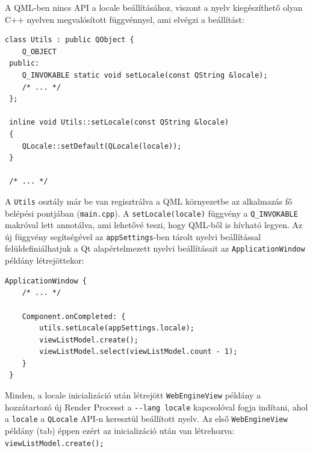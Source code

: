 \documentclass[12pt]{report}
\begin{document}
A QML-ben nincs API a locale beállításához, viszont a nyelv kiegészíthető olyan C++ nyelven
megvalósított függvénnyel, ami elvégzi a beállítást:
\begin{lstlisting}[title=utils.h]
 class Utils : public QObject {
    Q_OBJECT
 public:
    Q_INVOKABLE static void setLocale(const QString &locale);
    /* ... */
 };

 inline void Utils::setLocale(const QString &locale)
 {
    QLocale::setDefault(QLocale(locale));
 }

 /* ... */
\end{lstlisting}
A \texttt{Utils} osztály már be van regisztrálva a QML környezetbe az alkalmazás fő belépési
pontjában (\texttt{main.cpp}). A \texttt{setLocale(locale)} függvény a \texttt{Q\_INVOKABLE}
makróval lett annotálva, ami lehetővé teszi, hogy QML-ből is hívható legyen. Az új függvény
segítségével az \texttt{appSettings}-ben tárolt nyelvi beállítással felüldefiniálhatjuk a
Qt alapértelmezett nyelvi beállításait az \texttt{ApplicationWindow} példány létrejöttekor:
\begin{lstlisting}[title=main.qml]
 ApplicationWindow {
    /* ... */

    Component.onCompleted: {
        utils.setLocale(appSettings.locale);
        viewListModel.create();
        viewListModel.select(viewListModel.count - 1);
    }
 }
\end{lstlisting}
Minden, a locale inicializáció után létrejött \texttt{WebEngineView} példány a hozzátartozó
új Render Processt a \texttt{-{}-lang locale} kapcsolóval fogja indítani, ahol a
\texttt{locale} a \texttt{QLocale} API-n keresztül beállított nyelv. Az első
\texttt{WebEngineView} példány (tab) éppen ezért az inicializáció után van létrehozva:
\texttt{viewListModel.create();}
\end{document}
